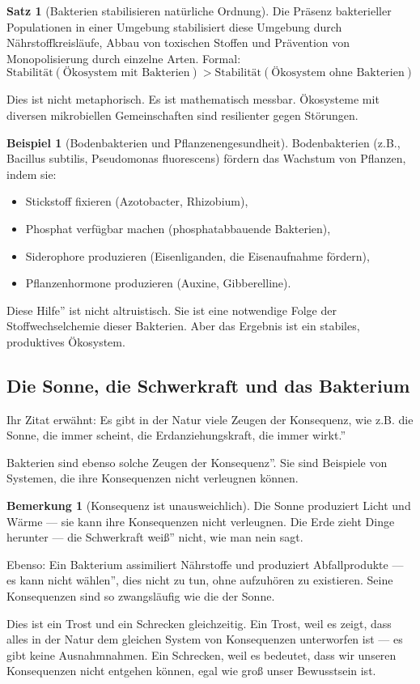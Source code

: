 \documentclass[a4paper,12pt]{article}
\theoremstyle{definition}
\newtheorem{beispiel}{Beispiel}
\newtheorem{satz}{Satz}
\newtheorem{bemerkung}{Bemerkung}
\begin{document}
\begin{satz}[Bakterien stabilisieren natürliche Ordnung]
Die Präsenz bakterieller Populationen in einer Umgebung stabilisiert diese Umgebung durch Nährstoffkreisläufe, Abbau von toxischen Stoffen und Prävention von Monopolisierung durch einzelne Arten. Formal:
\[
\text{Stabilität}(\text{Ökosystem mit Bakterien}) > \text{Stabilität}(\text{Ökosystem ohne Bakterien})
\]
\end{satz}

Dies ist nicht metaphorisch. Es ist mathematisch messbar. Ökosysteme mit diversen mikrobiellen Gemeinschaften sind resilienter gegen Störungen.

\begin{beispiel}[Bodenbakterien und Pflanzenengesundheit]
Bodenbakterien (z.B., Bacillus subtilis, Pseudomonas fluorescens) fördern das Wachstum von Pflanzen, indem sie:
\begin{itemize}
    \item[-] Stickstoff fixieren (Azotobacter, Rhizobium),
    \item[-] Phosphat verfügbar machen (phosphatabbauende Bakterien),
    \item[-] Siderophore produzieren (Eisenliganden, die Eisenaufnahme fördern),
    \item[-] Pflanzenhormone produzieren (Auxine, Gibberelline).
\end{itemize}
Diese Hilfe'' ist nicht altruistisch. Sie ist eine notwendige Folge der Stoffwechselchemie dieser Bakterien. Aber das Ergebnis ist ein stabiles, produktives Ökosystem.
\end{beispiel}

\subsection{Die Sonne, die Schwerkraft und das Bakterium}

Ihr Zitat erwähnt: Es gibt in der Natur viele Zeugen der Konsequenz, wie z.B. die Sonne, die immer scheint, die Erdanziehungskraft, die immer wirkt.''

Bakterien sind ebenso solche Zeugen der Konsequenz''. Sie sind Beispiele von Systemen, die ihre Konsequenzen nicht verleugnen können.

\begin{bemerkung}[Konsequenz ist unausweichlich]
Die Sonne produziert Licht und Wärme --- sie kann ihre Konsequenzen nicht verleugnen. Die Erde zieht Dinge herunter --- die Schwerkraft weiß'' nicht, wie man nein sagt. 

Ebenso: Ein Bakterium assimiliert Nährstoffe und produziert Abfallprodukte --- es kann nicht wählen'', dies nicht zu tun, ohne aufzuhören zu existieren. Seine Konsequenzen sind so zwangsläufig wie die der Sonne.

Dies ist ein Trost und ein Schrecken gleichzeitig. Ein Trost, weil es zeigt, dass alles in der Natur dem gleichen System von Konsequenzen unterworfen ist --- es gibt keine Ausnahmnahmen. Ein Schrecken, weil es bedeutet, dass wir unseren Konsequenzen nicht entgehen können, egal wie groß unser Bewusstsein ist.
\end{bemerkung}
\end{document}
